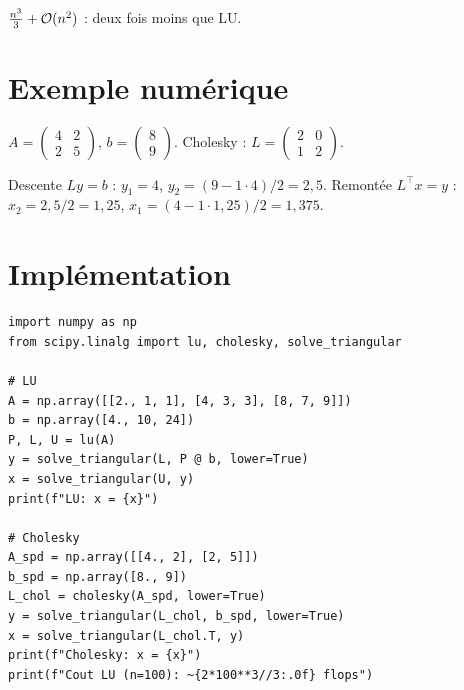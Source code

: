 \begin{algorithm}[H]
\caption{Factorisation de Cholesky}\label{alg:cholesky}
\end{algorithm}

\begin{theoreme}[Co\^ut de Cholesky]
$\frac{n^3}{3}+\mathcal{O}(n^2)$ : deux fois moins que LU.
\end{theoreme}

\section{Exemple num\'erique}

$A=\begin{pmatrix}4&2\\2&5\end{pmatrix}$, $b=\begin{pmatrix}8\\9\end{pmatrix}$. Cholesky : $L=\begin{pmatrix}2&0\\1&2\end{pmatrix}$.

Descente $Ly=b$ : $y_1=4$, $y_2=(9-1\cdot4)/2=2{,}5$. Remont\'ee $L^\top x=y$ : $x_2=2{,}5/2=1{,}25$, $x_1=(4-1\cdot 1{,}25)/2=1{,}375$.

\section{Impl\'ementation}

\begin{codeblock}[title=\textbf{Python}]
\begin{verbatim}
import numpy as np
from scipy.linalg import lu, cholesky, solve_triangular

# LU
A = np.array([[2., 1, 1], [4, 3, 3], [8, 7, 9]])
b = np.array([4., 10, 24])
P, L, U = lu(A)
y = solve_triangular(L, P @ b, lower=True)
x = solve_triangular(U, y)
print(f"LU: x = {x}")

# Cholesky
A_spd = np.array([[4., 2], [2, 5]])
b_spd = np.array([8., 9])
L_chol = cholesky(A_spd, lower=True)
y = solve_triangular(L_chol, b_spd, lower=True)
x = solve_triangular(L_chol.T, y)
print(f"Cholesky: x = {x}")
print(f"Cout LU (n=100): ~{2*100**3//3:.0f} flops")
\end{verbatim}
\end{codeblock}

